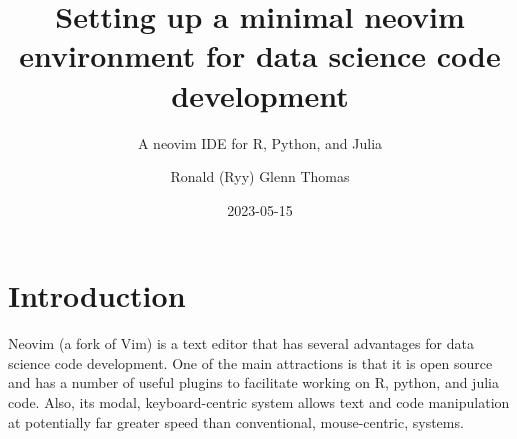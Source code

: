 \documentclass[
  letterpaper,
  DIV=11,
  numbers=noendperiod,
  oneside]{scrartcl}
\title{Setting up a minimal neovim environment for data science code
development}
\subtitle{A neovim IDE for R, Python, and Julia}
\author{Ronald (Ryy) Glenn Thomas}
\date{2023-05-15}
\renewcommand*\contentsname{Table of contents}
\newcommand\contentsname{Table of contents}
\begin{document}
\maketitle
\ifdefined\Shaded\renewenvironment{Shaded}{\begin{tcolorbox}[boxrule=0pt, borderline west={3pt}{0pt}{shadecolor}, sharp corners, frame hidden, interior hidden, breakable, enhanced]}{\end{tcolorbox}}\fi

\renewcommand*\contentsname{Table of contents}
{
\hypersetup{linkcolor=}
\setcounter{tocdepth}{3}
\tableofcontents
}

\hypertarget{introduction}{%
\section{Introduction}\label{introduction}}

Neovim (a fork of Vim) is a text editor that has several advantages for
data science code development. One of the main attractions is that it is
open source and has a number of useful plugins to facilitate working on
R, python, and julia code. Also, its modal, keyboard-centric system
allows text and code manipulation at potentially far greater speed than
conventional, mouse-centric, systems.
\end{document}
